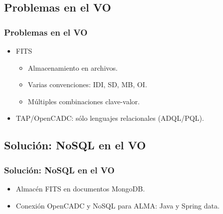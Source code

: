 \documentclass[serif,12pt]{beamer}
\begin{document}
\subsection{Problemas en el VO}
\begin{frame}
\frametitle{Problemas en el VO}

\begin{itemize}
\item FITS
  \begin{itemize}
    \item Almacenamiento en archivos.
    \item Varias convenciones: IDI, SD, MB, OI.
    \item Múltiples combinaciones clave-valor.
  \end{itemize}
\item TAP/OpenCADC: sólo lenguajes relacionales (ADQL/PQL).
\end{itemize}

\end{frame}



\subsection{Solución: NoSQL en el VO}
\begin{frame}
\frametitle{Solución: NoSQL en el VO}

\begin{itemize}
\item Almacén FITS en documentos MongoDB.
\item Conexión OpenCADC y NoSQL para ALMA: Java y Spring data.
\end{itemize}


\end{frame}


\end{document}
